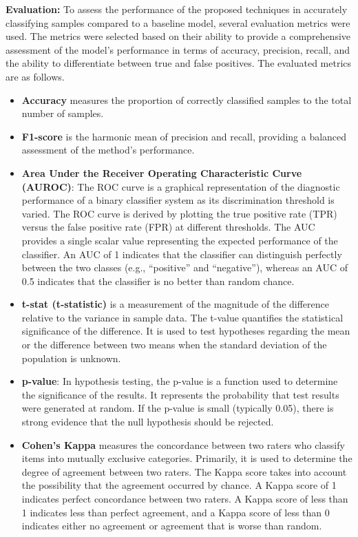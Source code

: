 \textbf{Evaluation: } To assess the performance of the proposed techniques in accurately classifying samples compared to a baseline model, several evaluation metrics were used. The metrics were selected based on their ability to provide a comprehensive assessment of the model's performance in terms of accuracy, precision, recall, and the ability to differentiate between true and false positives. The evaluated metrics are as follows.
\begin{itemize}
    \item \textbf{Accuracy} measures the proportion of correctly classified samples to the total number of samples.
    \item \textbf{F1-score} is the harmonic mean of precision and recall, providing a balanced assessment of the method's performance.
    \item \textbf{Area Under the Receiver Operating Characteristic Curve (AUROC)}: The ROC curve is a graphical representation of the diagnostic performance of a binary classifier system as its discrimination threshold is varied. The ROC curve is derived by plotting the true positive rate (TPR) versus the false positive rate (FPR) at different thresholds. The AUC provides a single scalar value representing the expected performance of the classifier. An AUC of 1 indicates that the classifier can distinguish perfectly between the two classes (e.g., ``positive'' and ``negative''), whereas an AUC of 0.5 indicates that the classifier is no better than random chance.
    \item \textbf{t-stat (t-statistic)} is a measurement of the magnitude of the difference relative to the variance in sample data. The t-value quantifies the statistical significance of the difference. It is used to test hypotheses regarding the mean or the difference between two means when the standard deviation of the population is unknown.
    \item \textbf{p-value}: In hypothesis testing, the p-value is a function used to determine the significance of the results. It represents the probability that test results were generated at random. If the p-value is small (typically 0.05), there is strong evidence that the null hypothesis should be rejected.
    \item \textbf{Cohen's Kappa} measures the concordance between two raters who classify items into mutually exclusive categories. Primarily, it is used to determine the degree of agreement between two raters. The Kappa score takes into account the possibility that the agreement occurred by chance. A Kappa score of 1 indicates perfect concordance between two raters. A Kappa score of less than 1 indicates less than perfect agreement, and a Kappa score of less than 0 indicates either no agreement or agreement that is worse than random.

\end{itemize}
